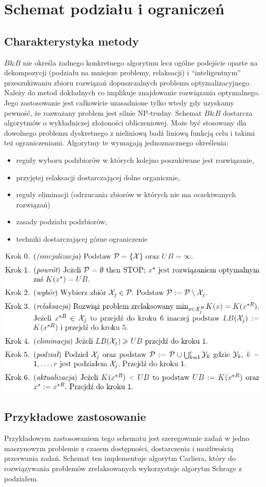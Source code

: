 \section{Schemat podziału i ograniczeń}
	\subsection{Charakterystyka metody}

		$B\&B$ nie określa żadnego konkretnego
		algorytmu lecz ogólne podejście oparte na dekompozycji (podziału na mniejsze problemy,
		relaksacji) i “inteligentnym”
		przeszukiwaniu zbioru rozwiązań dopuszczalnych problemu optymalizacyjnego.	
		Należy do metod dokładnych co implikuje znajdowanie rozwiązania optymalnego.
		Jego zastosowanie jest całkowicie uzasadnione tylko wtedy gdy uzyskamy pewność,
		że rozważany problem jest silnie NP-trudny. Schemat $B\&B$ dostarcza
		algorytmów o wykładniczej złożoności obliczeniowej.
		Może być stosowany dla dowolnego
		problemu dyskretnego z nieliniową badź liniową funkcją celu i takimi
		też ograniczeniami.
		Algorytmy te wymagają jednoznacznego określenia:
		\begin{itemize}
			\item reguły wyboru podzbiorów w których kolejno poszukiwane jest rozwiązanie,
			\item przyjętej relaksacji dostarczającej dolne organicznie,
			\item reguły eliminacji (odrzucania zbiorów w których nie ma oczekiwanych rozwiązań)
			\item zasady podziału podzbiorów,
			\item techniki dostarczającej górne ograniczenie
		\end{itemize}
		\includegraphics[width=1\textwidth]{alg.png}
	
	\subsection{Przykładowe zastosowanie}
		
		Przykładowym zastosowaniem tego schematu jest szeregowanie zadań w jedno maszynowym
		problemie z czasem dostępności, dostarczenia i możliwością przerwania zadań.
		Schemat ten implementuje algorytm Carliera, który do rozwiązywania problemów 
		zrelaksowanych wykorzystuje algorytm Schrage z podziałem.